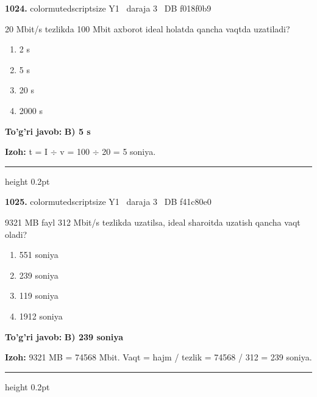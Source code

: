 \documentclass[10pt,a4paper,oneside]{article}
\begin{document}
\noindent\textbf{\color{ink}1024.}  {color{muted}scriptsize Y1 \textbullet\ daraja 3 \textbullet\ DB f018f0b9}
\par
20 Mbit/s tezlikda 100 Mbit axborot ideal holatda qancha vaqtda uzatiladi?
\begin{enumerate}[label=\Alph*),leftmargin=9mm]
\item 2 s
\item 5 s
\item 20 s
\item 2000 s
\end{enumerate}
\begin{tcolorbox}[enhanced,breakable,colback=teal!4,colframe=teal!50!black,boxrule=0.5pt,arc=1.1mm,left=3mm,right=3mm,top=1.7mm,bottom=1.7mm,before skip=2mm,after skip=2mm]
\textbf{\color{teal}To'g'ri javob:} \textbf{B) 5 s}
\par\smallskip
\textbf{Izoh:} t = I \ensuremath{\div} v = 100 \ensuremath{\div} 20 = 5 soniya.
\end{tcolorbox}
\vspace{2mm}\hrule height 0.2pt \vspace{3mm}

\noindent\textbf{\color{ink}1025.}  {color{muted}scriptsize Y1 \textbullet\ daraja 3 \textbullet\ DB f41c80e0}
\par
9321 MB fayl 312 Mbit/s tezlikda uzatilsa, ideal sharoitda uzatish qancha vaqt oladi?
\begin{enumerate}[label=\Alph*),leftmargin=9mm]
\item 551 soniya
\item 239 soniya
\item 119 soniya
\item 1912 soniya
\end{enumerate}
\begin{tcolorbox}[enhanced,breakable,colback=teal!4,colframe=teal!50!black,boxrule=0.5pt,arc=1.1mm,left=3mm,right=3mm,top=1.7mm,bottom=1.7mm,before skip=2mm,after skip=2mm]
\textbf{\color{teal}To'g'ri javob:} \textbf{B) 239 soniya}
\par\smallskip
\textbf{Izoh:} 9321 MB = 74568 Mbit. Vaqt = hajm / tezlik = 74568 / 312 = 239 soniya.
\end{tcolorbox}
\vspace{2mm}\hrule height 0.2pt \vspace{3mm}
\end{document}
